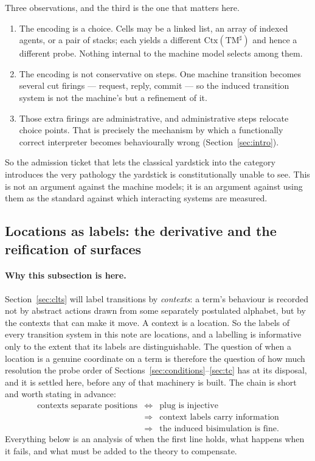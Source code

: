 \documentclass[11pt,a4paper]{article}
\theoremstyle{definition}
\theoremstyle{plain}
\theoremstyle{remark}
\newcommand{\Ctx}{\mathrm{Ctx}}
\begin{document}
Three observations, and the third is the one that matters here.

\begin{enumerate}[leftmargin=1.6em]
\item The encoding is a choice. Cells may be a linked list, an array of indexed
agents, or a pair of stacks; each yields a different $\Ctx(\mathrm{TM}^\sharp)$ and
hence a different probe. Nothing internal to the machine model selects among them.
\item The encoding is not conservative on steps. One machine transition becomes
several cut firings --- request, reply, commit --- so the induced transition system is
not the machine's but a refinement of it.
\item Those extra firings are administrative, and administrative steps relocate
choice points. That is precisely the mechanism by which a functionally correct
interpreter becomes behaviourally wrong (Section~\ref{sec:intro}).
\end{enumerate}

So the admission ticket that lets the classical yardstick into the category
introduces the very pathology the yardstick is constitutionally unable to see. This
is not an argument against the machine models; it is an argument against using them
as the standard against which interacting systems are measured.

\subsection{Locations as labels: the derivative and the reification of surfaces}
\label{sec:derivative}

\paragraph{Why this subsection is here.}
Section~\ref{sec:clts} will label transitions by \emph{contexts}: a term's behaviour
is recorded not by abstract actions drawn from some separately postulated alphabet,
but by the contexts that can make it move. A context is a location. So the labels of
every transition system in this note are locations, and a labelling is informative
only to the extent that its labels are distinguishable. The question of when a
location is a genuine coordinate on a term is therefore the question of how much
resolution the probe order of Sections~\ref{sec:conditions}--\ref{sec:tc} has at its
disposal, and it is settled here, before any of that machinery is built. The chain is
short and worth stating in advance:
\[
\begin{array}{rcl}
\text{contexts separate positions} &\iff& \mathrm{plug} \text{ is injective}\\[2pt]
&\Longrightarrow& \text{context labels carry information}\\[2pt]
&\Longrightarrow& \text{the induced bisimulation is fine.}
\end{array}
\]
Everything below is an analysis of when the first line holds, what happens when it
fails, and what must be added to the theory to compensate.
\end{document}
